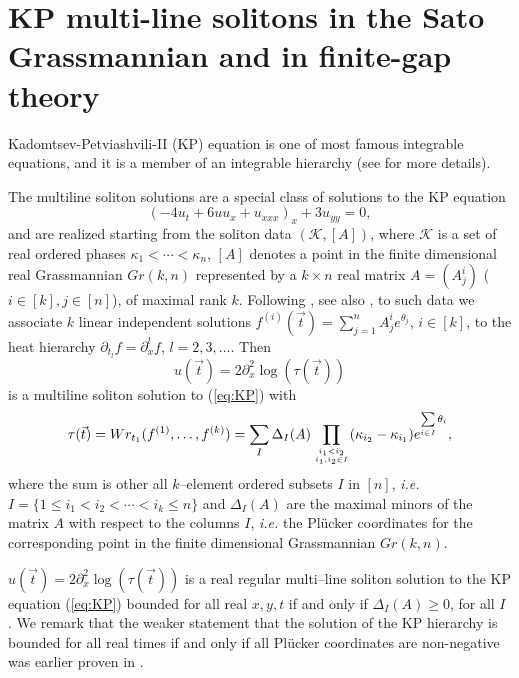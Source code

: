 \documentclass[11pt]{amsart}
\theoremstyle{plain}
\numberwithin{equation}{section}
\newcommand\mycom[2]{\genfrac{}{}{0pt}{}{#1}{#2}}
\begin{document}
\section{KP multi-line solitons in the Sato Grassmannian and in finite-gap theory}\label{sec:soliton_theory}

Kadomtsev-Petviashvili-II (KP) equation is one of most famous integrable equations, and it is a member of an integrable hierarchy (see \cite{D,DKN,H,MJD,S} for more details).  

The multiline soliton solutions are a special class of solutions to the KP equation \cite{KP}
\begin{equation}\label{eq:KP}
(-4u_t+6uu_x+u_{xxx})_x+3u_{yy}=0,
\end{equation}
and are realized starting from the soliton data $({\mathcal K}, [A])$, where 
${\mathcal K}$ is a set of real ordered phases $\kappa_1<\cdots<\kappa_n$, $[A]$ denotes
a point in the finite dimensional real Grassmannian $Gr (k,n)$ represented by a $k\times n$ real matrix  $A =( A^i_j )$ ($i\in [k], j\in [n]$), of maximal rank $k$.
Following \cite{Mat}, see also \cite{FN}, to such data we associate $k$ linear independent solutions
$f^{(i)}(\vec t) = \sum_{j=1}^n A^i_j e^{\theta_j}$, $i\in [k]$, to the heat hierarchy
$\partial_{t_l} f = \partial_x^l f$, $l=2,3,\dots$.
Then
\begin{equation}\label{eq:KPsol}
u( {\vec t} ) = 2\partial_{x}^2 \log(\tau ( {\vec t}))
\end{equation}
is a multiline soliton solution to (\ref{eq:KP}) with
\[
\tau (\vec t) = Wr_{t_1} (f^{(1)},\dots, f^{(k)})= \sum\limits_{I} \Delta_I (A)\prod_{\mycom{i_1<i_2}{ i_1,i_2 \in I}} (\kappa_{i_2}-\kappa_{i_1} ) e^{ \sum\limits_{i\in I} \theta_i },
\]
where the sum is other all $k$--element ordered subsets $I$ in $[n]$, {\it i.e.} $I=\{ 1\le i_1<i_2 < \cdots < i_k \le n\}$ and $\Delta_I (A)$ are the maximal minors of the matrix $A$ with respect to the columns $I$, {\it i.e.} the Pl\"ucker coordinates for the corresponding point in the finite dimensional Grassmannian $Gr (k,n)$.

$u( {\vec t} ) = 2\partial_{x}^2 \log(\tau ( {\vec t}))$ 
is a real regular multi--line soliton solution to the KP equation (\ref{eq:KP}) bounded for all real $x,y,t$ if and only if $\Delta_I (A) \ge 0$, for all $I$ \cite{KW2}. We remark that the weaker statement that the solution of the KP hierarchy is bounded for all real times if and only if all Pl\"ucker coordinates are non-negative was earlier proven in \cite{Mal}.
\end{document}
